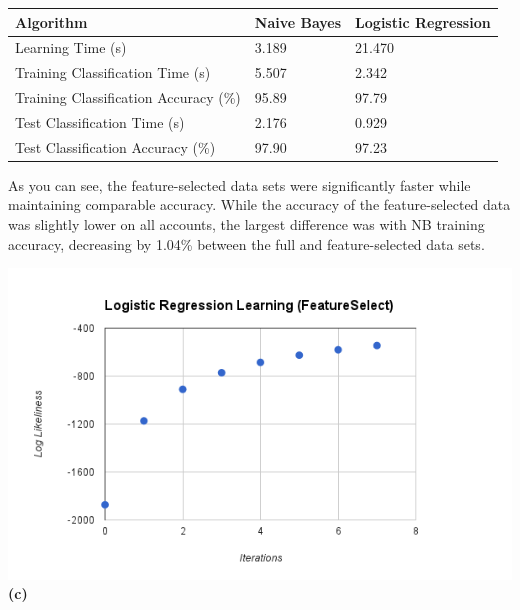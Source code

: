 \documentclass[11pt]{article}
\renewcommand{\part}[1] {\vspace{.10in} {\bf (#1)}}
\begin{document}
    \begin{tabular}{|l|l|l|}
        \hline
        Algorithm                             & Naive Bayes & Logistic Regression \\ \hline
        Learning Time (s)                     & 3.189       & 21.470              \\ 
        Training Classification Time (s)      & 5.507       & 2.342               \\ 
        Training Classification Accuracy (\%) & 95.89       & 97.79               \\ 
        Test Classification Time (s)          & 2.176       & 0.929               \\ 
        Test Classification Accuracy (\%)     & 97.90       & 97.23               \\
        \hline
    \end{tabular}

As you can see, the feature-selected data sets were significantly faster while maintaining comparable accuracy. While the accuracy of the feature-selected data was slightly lower on all accounts, the largest difference was with NB training accuracy, decreasing by 1.04\% between the full and feature-selected data sets. 

\includegraphics[scale=0.75]{4b.png}\\

\part{c}
\end{document}

